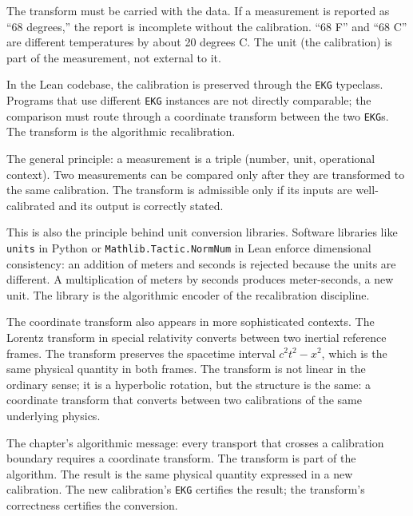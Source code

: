 The transform must be carried with the data. If a measurement is
reported as ``68 degrees,'' the report is incomplete without the
calibration. ``68 F'' and ``68 C'' are different temperatures by
about 20 degrees C. The unit (the calibration) is part of the
measurement, not external to it.

In the Lean codebase, the calibration is preserved through the
\texttt{EKG} typeclass. Programs that use different
\texttt{EKG} instances are not directly comparable; the comparison
must route through a coordinate transform between the two
\texttt{EKG}s. The transform is the algorithmic recalibration.

The general principle: a measurement is a triple (number, unit,
operational context). Two measurements can be compared only after
they are transformed to the same calibration. The transform is
admissible only if its inputs are well-calibrated and its output is
correctly stated.

This is also the principle behind unit conversion libraries.
Software libraries like \texttt{units} in Python or
\texttt{Mathlib.Tactic.NormNum} in Lean enforce dimensional
consistency: an addition of meters and seconds is rejected
because the units are different. A multiplication of meters by
seconds produces meter-seconds, a new unit. The library is the
algorithmic encoder of the recalibration discipline.

The coordinate transform also appears in more sophisticated
contexts. The Lorentz transform in special relativity converts
between two inertial reference frames. The transform preserves
the spacetime interval $c^2 t^2 - x^2$, which is the same physical
quantity in both frames. The transform is not linear in the
ordinary sense; it is a hyperbolic rotation, but the structure is
the same: a coordinate transform that converts between two
calibrations of the same underlying physics.

The chapter's algorithmic message: every transport that crosses a
calibration boundary requires a coordinate transform. The transform
is part of the algorithm. The result is the same physical quantity
expressed in a new calibration. The new calibration's
\texttt{EKG} certifies the result; the transform's correctness
certifies the conversion.

